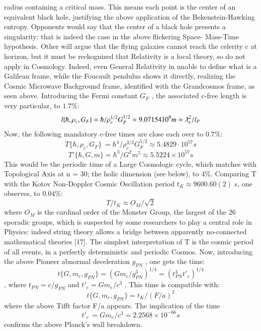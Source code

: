 \documentclass[twoside,draft]{article}
\begin{document}
\begin{sloppypar}
{radius containing a critical mass. This means each point is the center of an equivalent black hole,
justifying the above application of the Bekenstein-Hawking entropy. Opponents would say that the
center of a black hole presents a singularity: that is indeed the case in the above flickering Space-
Mass-Time hypothesis. Other will argue that the flying galaxies cannot reach the celerity c at
horizon, but it must be reckognized that Relativity is a local theory, so do not apply in Cosmology.
Indeed, even General Relativity in unable to define what is a Galilean frame, while the Foucault
pendulus shows it directly, realizing the Cosmic Microwave Background frame, identified with the
Grandcosmos frame, as seen above.
Introducing the Fermi constant $G_{F}$ , the associated c-free length is very particular, to $1.7\%$:
$$l\{\hbar,\rho_{c},G_{F}\} = \hbar/\rho_{c}^{1/2} G_{F}^{1/2} \approx 9.07154 10^{9} m \approx \lambdabar_{e}^{2}/l_{P}$$
Now, the following mandatory c-free times are close each over to $0.7\%$:
\begin{equation}
T\{\hbar,\rho_{c} ,G_{F} \}\, = \hbar^{4} /\rho_{c}^{3/2} G_{F}^{5/2} \approx 5.4829 \cdot 10^{57} s
\end{equation}
$$T\prime\{\hbar,G,m\} = \hbar^{3} /G^{2} m^{5} \approx 5.5224 \times 10^{57} s$$
This would be the periodic time of a Large Cosmologic cycle, which matches with Topological Axis at n = 30;
the holic dimension (see below), to 4\%. Comparing T with the Kotov Non-Doppler Cosmic
Oscillation period $t_{K} \approx 9600.60(2)$ s, one observes, to $0.04\%$:
$$T/t_{K} \approx O_{M} /\sqrt{2}$$
where $O_{M}$ is the cardinal order of the Monster Group, the largest of the 26 sporadic groups, which is
suspected by some researchers to play a central role in Physics: indeed string theory allows a bridge
between apparently no-connected mathematical theories \cite{Borcherds}[17]. The simplest interpretation of T is the
cosmic period of all events, in a perfectly deterministic and periodic Cosmos.
Now, introducing the above Pioneer abnormal deceleration $g_{PN}$ , one gets the time: 
\begin{equation}
t\{G, m_{e} , g_{PN} \} = (Gm_{e} /g_{PN}^{3} )^{1/4} = (t_{PN}^{3} t\prime_{e} )^{1/4}
\end{equation}, where $t_{PN} = c/g_{PN}$ and $t\prime_{e} = Gm_{e} /c^{3}$ . This time is compatible with:
\begin{equation}
t\{G, m_{e} , g_{PN} \} = t_{K} /(F/a)^{2}
\end{equation}
where the above Tifft factor F/a appears. The implication of the time 
\begin{equation}
t\prime_{e}\, = Gm_{e} /c^{3} = 2.2568 \times 10^{-66} s
\end{equation}
confirms the above Planck's wall breakdown.

}
\end{sloppypar}
\end{document}
